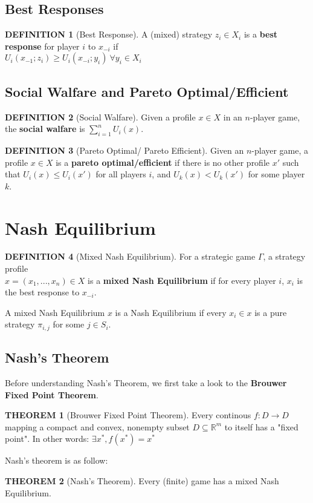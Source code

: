 \documentclass[12pt]{article}
\theoremstyle{definition}
\newtheorem*{definition}{DEFINITION}
\newtheorem*{theorem}{THEOREM}
\begin{document}
    \subsection*{Best Responses}
        \begin{definition}[Best Response]
            A (mixed) strategy $z_i \in X_i$ is a \textbf{best response} for player $i$ to $x_{-i}$ if \\$U_i(x_{-1};z_i) \geq U_i(x_{-i};y_i) \ \forall y_i \in X_i$
        \end{definition}

    \subsection*{Social Walfare and Pareto Optimal/Efficient}
        \begin{definition}[Social Walfare]
            Given a profile $x \in X$ in an $n$-player game, the \textbf{social walfare} is $\sum_{i=1}^n U_i(x)$.
        \end{definition}
        \begin{definition}[Pareto Optimal/ Pareto Efficient]
            Given an $n$-player game, a profile $x \in X$ is a \textbf{pareto optimal/efficient} if there is no other profile $x'$ such that $U_i(x) \leq U_i(x')$ for all players $i$, and $U_k(x) < U_k(x')$ for some player $k$.
        \end{definition}

\section{Nash Equilibrium}
    \begin{definition}[Mixed Nash Equilibrium]
        For a strategic game $\Gamma$, a strategy profile \\$x = (x_1,...,x_n) \in X$ is a \textbf{mixed Nash Equilibrium} if for every player $i$, $x_i$ is the best response to $x_{-i}$.
    \end{definition}
    A mixed Nash Equilibrium $x$ is a Nash Equilibrium if every $x_i \in x$ is a pure strategy $\pi_{i,j}$ for some $j \in S_i$.
    
    \subsection*{Nash's Theorem}
    Before understanding Nash's Theorem, we first take a look to the \textbf{Brouwer Fixed Point Theorem}.
    \begin{theorem}[Brouwer Fixed Point Theorem]
        Every continous $f: D \rightarrow D$ mapping a compact and convex, nonempty subset $D \subseteq \mathbb{R}^m$ to itself has a "fixed point". In other words: $\exists x^*, f(x^*) = x^*$
    \end{theorem} 
    Nash's theorem is as follow:
    \begin{theorem}[Nash's Theorem]
        Every (finite) game has a mixed Nash Equilibrium.
    \end{theorem}
\end{document}
